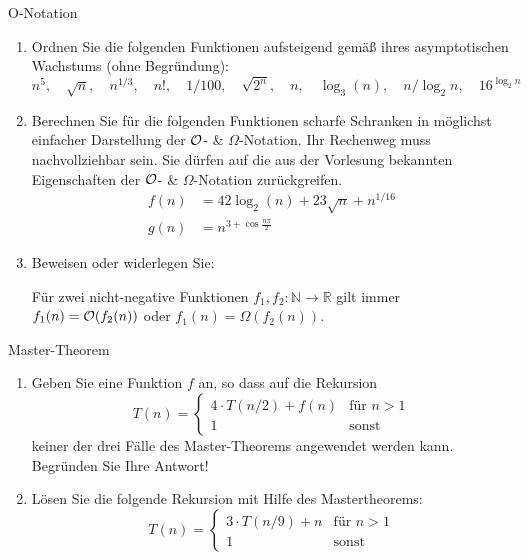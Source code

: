 \documentclass{article}
\begin{document}
\begin{exercise}{O-Notation}
  \begin{enumerate}
    \item Ordnen Sie die folgenden Funktionen aufsteigend gemäß ihres asymptotischen Wachstums (ohne Begründung):
          \begin{equation*}
            n^5,\quad \sqrt{n},\quad n^{1/3},\quad n!,\quad 1/100,\quad \sqrt{2^n},\quad n,\quad \log_3(n),\quad n/\log_2{n},\quad 16^{\log_2{n}}
          \end{equation*}
    \item Berechnen Sie für die folgenden Funktionen scharfe Schranken in möglichst einfacher Darstellung der $\mathcal{O}$- \& $\Omega$-Notation. Ihr Rechenweg muss nachvollziehbar sein. Sie dürfen auf die aus der Vorlesung bekannten Eigenschaften der $\mathcal{O}$- \& $\Omega$-Notation zurückgreifen.
          \begin{align*}
            f(n) & = 42\log_2(n) + 23\sqrt{n} + n^{1/16} \\
            g(n) & = n^{3+\cos{\frac{n\pi}{2}}}
          \end{align*}
    \item Beweisen oder widerlegen Sie:\par Für zwei nicht-negative Funktionen $f_1, f_2: \mathbb{N} \to \mathbb{R}$ gilt immer $f_1(n) = \mathcal{O}(f_2(n))$ oder $f_1(n) = \Omega(f_2(n))$.
  \end{enumerate}
\end{exercise}

\begin{exercise}{Master-Theorem}
  \begin{enumerate}
    \item Geben Sie eine Funktion $f$ an, so dass auf die Rekursion
          \begin{equation*}
            T(n) = \begin{cases}
              4\cdot T(n/2) + f(n) & \text{für } n > 1 \\
              1                    & \text{sonst}
            \end{cases}
          \end{equation*}
          keiner der drei Fälle des Master-Theorems angewendet werden kann. Begründen Sie Ihre Antwort!
    \item Lösen Sie die folgende Rekursion mit Hilfe des Mastertheorems:
          \begin{equation*}
            T(n) = \begin{cases}
              3\cdot T(n/9) + n & \text{für } n > 1 \\
              1                 & \text{sonst}
            \end{cases}
          \end{equation*}
  \end{enumerate}
\end{exercise}
\end{document}
